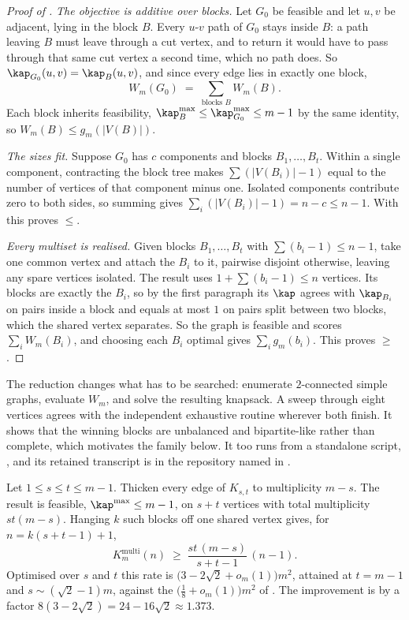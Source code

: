 \begin{proof}[Proof of ]
\emph{The objective is additive over blocks.} Let $G_0$ be feasible and let $u,v$ be adjacent, lying in the block $B$. Every $u$-$v$ path of $G_0$ stays inside $B$: a path leaving $B$ must leave through a cut vertex, and to return it would have to pass through that same cut vertex a second time, which no path does. So $\kap_{G_0}(u,v) = \kap_B(u,v)$, and since every edge lies in exactly one block,
\[
    W_m(G_0) \;=\; \sum_{\text{blocks } B} W_m(B) .
\]
Each block inherits feasibility, $\kap^{\max}_B \le \kap^{\max}_{G_0} \le m-1$ by the same identity, so $W_m(B) \le g_m(|V(B)|)$.

\emph{The sizes fit.} Suppose $G_0$ has $c$ components and blocks $B_1, \dots, B_t$. Within a single component, contracting the block tree makes $\sum (|V(B_i)|-1)$ equal to the number of vertices of that component minus one. Isolated components contribute zero to both sides, so summing gives $\sum_i (|V(B_i)| - 1) = n-c \le n-1$. With  this proves $\le$.

\emph{Every multiset is realised.} Given blocks $B_1, \dots, B_t$ with $\sum (b_i - 1) \le n-1$, take one common vertex and attach the $B_i$ to it, pairwise disjoint otherwise, leaving any spare vertices isolated. The result uses $1 + \sum (b_i-1) \le n$ vertices. Its blocks are exactly the $B_i$, so by the first paragraph its $\kap$ agrees with $\kap_{B_i}$ on pairs inside a block and equals at most $1$ on pairs split between two blocks, which the shared vertex separates. So the graph is feasible and scores $\sum_i W_m(B_i)$, and choosing each $B_i$ optimal gives $\sum_i g_m(b_i)$. This proves $\ge$.
\end{proof}

The reduction changes what has to be searched: enumerate $2$-connected simple
graphs, evaluate $W_m$, and solve the resulting knapsack. A sweep through eight
vertices agrees with the independent exhaustive routine wherever both finish.
It shows that the winning blocks are unbalanced and bipartite-like rather than
complete, which motivates the family below. It too runs from a standalone script,
, and its retained
transcript is  in the repository named
in .

\begin{theorem}\label{thm:multi-vertex-bipartite}
Let $1 \le s \le t \le m-1$. Thicken every edge of $K_{s,t}$ to multiplicity $m-s$. The result is feasible, $\kap^{\max} \le m-1$, on $s+t$ vertices with total multiplicity $st(m-s)$. Hanging $k$ such blocks off one shared vertex gives, for $n = k(s+t-1)+1$,
\[
    K_m^{\mathrm{multi}}(n) \;\ge\; \frac{st\,(m-s)}{s+t-1}\,(n-1) .
\]
Optimised over $s$ and $t$ this rate is $\bigl(3 - 2\sqrt{2} + o_m(1)\bigr)m^2$, attained at $t = m-1$ and $s \sim (\sqrt{2}-1)m$, against the $\bigl(\tfrac18 + o_m(1)\bigr)m^2$ of . The improvement is by a factor $8(3-2\sqrt{2}) = 24 - 16\sqrt{2} \approx 1.373$.
\end{theorem}

